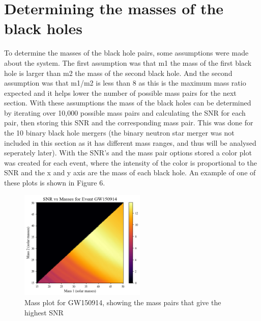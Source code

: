 \documentclass{article}
\begin{document}
\section*{Determining the masses of the black holes}
To determine the masses of the black hole pairs, some assumptions were made
about the system. The first assumption was that m1 the mass of the first black hole is larger
than m2 the mass of the second black hole. And the second assumption was that m1/m2 is less than 8
as this is the maximum mass ratio expected and it helps lower the number of possible mass pairs
for the next section. With these assumptions the mass of the black holes can be determined by
iterating over 10,000 possible mass pairs and calculating the SNR for each pair, then storing this
SNR and the corresponding mass pair. This was done for the 10 binary black hole mergers (the binary neutron star
merger was not included in this section as it has different mass ranges, and thus will be analysed seperately
later). With the SNR's and the mass pair options stored a color plot was created for each event, where
the intensity of the color is proportional to the SNR and the x and y axis are the mass of each black hole.
An example of one of these plots is shown in Figure 6.
\begin{figure}[h]
    \includegraphics[width=6cm]{images/snr_color.png}
    \caption{Mass plot for GW150914, showing the mass pairs that give the highest SNR}
    \label{fig:mass_plot}
\end{figure}
\newline
\end{document}
